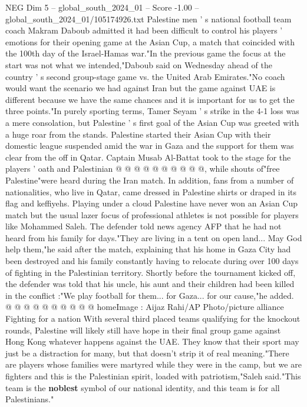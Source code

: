 \begin{textsample}{NEG Dim 5 – global\_south\_2024\_01 – Score -1.00 – global\_south\_2024\_01/105174926.txt}  \label{ex:f5_neg_443}
Palestine men ' s national football team coach Makram Daboub admitted it had been difficult to control his players ' emotions for their opening game at the Asian Cup, a match that coincided with the 100th day of the Israel-Hamas war."In the previous game the focus at the start was not what we intended,"Daboub said on Wednesday ahead of the country ' s second group-stage game vs. the United Arab Emirates."No coach would want the scenario we had against Iran but the game against UAE is different because we have the same chances and it is important for us to get the three points."In purely sporting terms, Tamer Seyam ' s strike in the 4-1 loss was a mere consolation, but Palestine ' s first goal of the Asian Cup was greeted with a huge roar from the stands.
Palestine started their Asian Cup with their domestic league suspended amid the war in Gaza and the support for them was clear from the off in Qatar.
Captain Musab Al-Battat took to the stage for the players ' oath and Palestinian @ @ @ @ @ @ @ @ @ @, while shouts of"free Palestine"were heard during the Iran match.
In addition, fans from a number of nationalities, who live in Qatar, came dressed in Palestine shirts or draped in its flag and keffiyehs.
Playing under a cloud Palestine have never won an Asian Cup match but the usual lazer focus of professional athletes is not possible for players like Mohammed Saleh.
The defender told news agency AFP that he had not heard from his family for days."They are living in a tent on open land...
May God help them,"he said after the match, explaining that his home in Gaza City had been destroyed and his family constantly having to relocate during over 100 days of fighting in the Palestinian territory.
Shortly before the tournament kicked off, the defender was told that his uncle, his aunt and their children had been killed in the conflict :"We play football for them... for Gaza... for our cause,"he added. @ @ @ @ @ @ @ @ @ @ homeImage : Aijaz Rahi/AP Photo/picture alliance Fighting for a nation With several third placed teams qualifying for the knockout rounds, Palestine will likely still have hope in their final group game against Hong Kong whatever happens against the UAE.
They know that their sport may just be a distraction for many, but that doesn't strip it of real meaning."There are players whose families were martyred while they were in the camp, but we are fighters and this is the Palestinian spirit, loaded with patriotism,"Saleh said."This team is the \textbf{noblest} symbol of our national identity, and this team is for all Palestinians."

\end{textsample}
